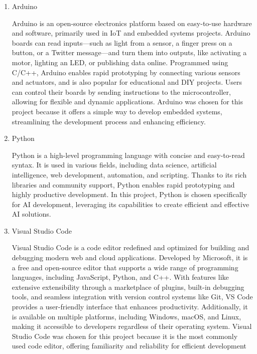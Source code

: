 \documentclass[conference]{IEEEtran}
\begin{document}
\begin{enumerate}[itemsep=2ex, parsep=1ex]
		\item Arduino

			Arduino is an open-source electronics platform based on easy-to-use
			hardware and software, primarily used in IoT and embedded systems projects.
			Arduino boards can read inputs—such as light from a sensor, a finger press
			on a button, or a Twitter message—and turn them into outputs, like activating
			a motor, lighting an LED, or publishing data online. Programmed using C/C++,
			Arduino enables rapid prototyping by connecting various sensors and actuators,
			and is also popular for educational and DIY projects. Users can control their
			boards by sending instructions to the microcontroller, allowing for
			flexible and dynamic applications. Arduino was chosen for this project because
			it offers a simple way to develop embedded systems, streamlining the
			development process and enhancing efficiency.

		\item Python

			Python is a high-level programming language with concise and easy-to-read
			syntax. It is used in various fields, including data science, artificial intelligence,
			web development, automation, and scripting. Thanks to its rich libraries and
			community support, Python enables rapid prototyping and highly productive
			development. In this project, Python is chosen specifically for AI
			development, leveraging its capabilities to create efficient and effective
			AI solutions.

		\item Visual Studio Code

			Visual Studio Code is a code editor redefined and optimized for building
			and debugging modern web and cloud applications. Developed by Microsoft,
			it is a free and open-source editor that supports a wide range of
			programming languages, including JavaScript, Python, and C++. With
			features like extensive extensibility through a marketplace of plugins, built-in
			debugging tools, and seamless integration with version control systems
			like Git, VS Code provides a user-friendly interface that enhances productivity.
			Additionally, it is available on multiple platforms, including Windows, macOS,
			and Linux, making it accessible to developers regardless of their operating
			system. Visual Studio Code was chosen for this project because it is the
			most commonly used code editor, offering familiarity and reliability for efficient
			development


\end{enumerate}
\end{document}
